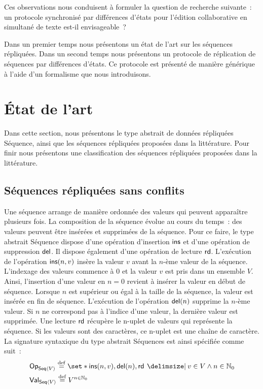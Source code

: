 Ces observations nous conduisent à formuler la question de recherche suivante~: un protocole synchronisé par différences d'états pour l'édition collaborative en simultané de texte est-il envisageable~?

Dans un premier temps nous présentons un état de l'art sur les séquences répliquées.
Dans un second temps nous présentons un protocole de réplication de séquences par différences d'états.
Ce protocole est présenté de manière générique à l'aide d'un formalisme que nous introduisons.


\section{État de l'art}\label{sec:state-art-seq}

Dans cette section, nous présentons le type abstrait de données répliquées Séquence, ainsi que les séquences répliquées proposées dans la littérature.
Pour finir nous présentons une classification des séquences répliquées proposées dans la littérature.

\subsection{Séquences répliquées sans conflits}\label{subsec:replseq}

Une séquence arrange de manière ordonnée des valeurs qui peuvent apparaître plusieurs fois.
La composition de la séquence évolue au cours du temps~:
des valeurs peuvent être insérées et supprimées de la séquence.
Pour ce faire, le type abstrait Séquence dispose d'une opération d'insertion $\operatorname{\mathsf{ins}}$ et d'une opération de suppression $\operatorname{\mathsf{del}}$.
Il dispose également d'une opération de lecture $\operatorname{\mathsf{rd}}$.
L'exécution de l'opération $\operatorname{\mathsf{ins}}(n, v)$ insère la valeur $v$ avant la $n$-ème valeur de la séquence.
L'indexage des valeurs commence à $0$ et la valeur $v$ est pris dans un ensemble $V$.
Ainsi, l'insertion d'une valeur en $n = 0$ revient à insérer la valeur en début de séquence.
Lorsque $n$ est supérieur ou égal à la taille de la séquence, la valeur est insérée en fin de séquence.
L'exécution de l'opération $\operatorname{\mathsf{del}}(n)$ supprime la $n$-ème valeur.
Si $n$ ne correspond pas à l'indice d'une valeur, la dernière valeur est supprimée.
Une lecture $\operatorname{\mathsf{rd}}$ récupère le n-uplet de valeurs qui représente la séquence.
Si les valeurs sont des caractères, ce n-uplet est une chaîne de caractère.
La signature syntaxique du type abstrait Séquences est ainsi spécifiée comme suit~:
\begin{align*}
&\trm{Op}_{\trm{Seq}\tuple*{V}} \defeq \set*{\trm{ins}(n, v), \trm{del}(n), \trm{rd} \given v \in V \land n \in \mathbb{N}_0}\\
&\trm{Val}_{\trm{Seq}\tuple*{V}} \defeq V^{n \in \mathbb{N}_0}
\end{align*}

